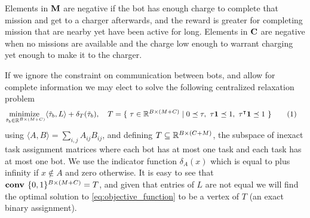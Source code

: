 \documentclass{article}
\newcommand\numberthis{\addtocounter{equation}{1}\tag{\theequation}}
\begin{document}
 Elements in ${\mathbf{M}}$ are negative if the bot has enough charge to complete that mission and get to a charger afterwards, and the reward is greater for completing mission that are nearby yet have been active for long. Elements in ${\mathbf{C}}$ are negative when no missions are available and the charge low enough to warrant charging yet enough to make it to the charger. \newline

If we ignore the constraint on communication between bots, and allow for complete information we may elect to solve the following centralized relaxation problem
\begin{align*}
    \underset{\tilde{\tau}_b \in \RR^{B \times (M+C)}}{\text{minimize }} &  \langle \tilde{\tau}_b, L \rangle + \delta_T(\tilde{\tau}_b),\quad
    T = \{\ \tau \in \RR^{B \times (M+C)} \mid 0 \preceq \tau,\ \tau\vone \preceq 1,\ \tau^\T\vone \preceq 1\ \}
    \numberthis \label{eq:objective_function}
\end{align*}
using $\langle A, B \rangle = \sum_{i,j} A_{ij}B_{ij}$, and defining $T\subseteq\mathbb{R}^{B\times(C+M)}$, the subspace of inexact task assignment matrices where each bot has at most one task and each task has at most one bot. We use the indicator function $\delta_A(x)$ which is equal to plus infinity if $x \not\in A$ and zero otherwise. It is easy to see that $\text{\bf conv } \{0,1\}^{B\times(M+C)} = T$, and given that entries of $L$ are not equal we will find the optimal solution to \eqref{eq:objective_function} to be a vertex of $T$ (an exact binary assignment).
\end{document}
